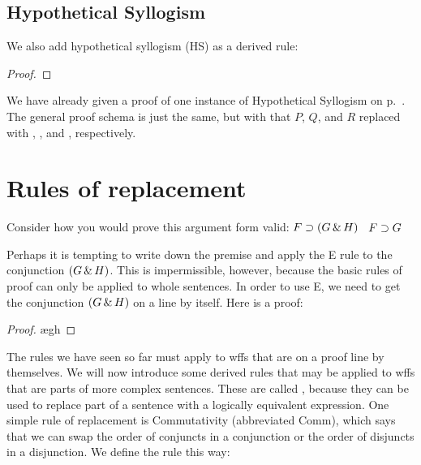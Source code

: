 \subsection{Hypothetical Syllogism}



We also add hypothetical syllogism (HS) as a derived rule:

\begin{proof}
\end{proof}

We have already given a proof of one instance of Hypothetical Syllogism on p.~\pageref{HSproof}. The general proof schema is just the same, but with that $P$, $Q$, and $R$ replaced with \metaA{}, \metaB{}, and \metaC{}, respectively.





\section{Rules of replacement}

Consider how you would prove this argument form valid: $F\supset(G\,\&\, H)$ \therefore\ $F\supset G$

Perhaps it is tempting to write down the premise and apply the {\eand}E rule to the conjunction $(G \,\&\, H)$. This is impermissible, however, because the basic rules of proof can only be applied to whole sentences. In order to use {\eand}E, we need to get the conjunction $(G \,\&\, H)$ on a line by itself. Here is a proof:

\begin{proof}
	\open
		\ae{gh}
	\close
\end{proof}

The rules we have seen so far must apply to wffs that are on a proof line by themselves. We will now introduce some derived rules that may be applied to wffs that are parts of more complex sentences. These are called , because they can be used to replace part of a sentence with a logically equivalent expression. One simple rule of replacement is Commutativity (abbreviated Comm), which says that we can swap the order of conjuncts in a conjunction or the order of disjuncts in a disjunction. We define the rule this way:

